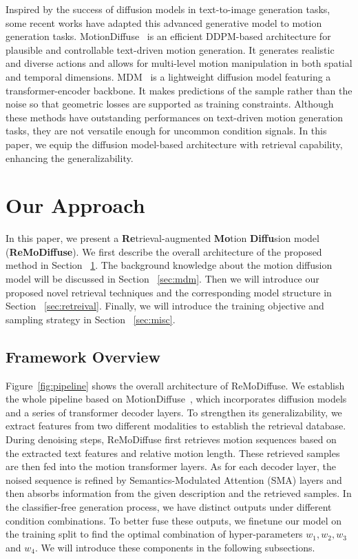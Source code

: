 \documentclass[10pt,twocolumn,letterpaper]{article}
\newcommand{\name}{ReMoDiffuse\xspace}
\begin{document}
Inspired by the success of diffusion models in text-to-image generation tasks, some recent works have adapted this advanced generative model to motion generation tasks. MotionDiffuse~\cite{zhang2022motiondiffuse} is an efficient DDPM-based architecture for plausible and controllable text-driven motion generation. It generates realistic and diverse actions and allows for multi-level motion manipulation in both spatial and temporal dimensions. MDM~\cite{tevet2022human} is a lightweight diffusion model featuring a transformer-encoder backbone. It makes predictions of the sample rather than the noise so that geometric losses are supported as training constraints. Although these methods have outstanding performances on text-driven motion generation tasks, they are not versatile enough for uncommon condition signals. In this paper, we equip the diffusion model-based architecture with retrieval capability, enhancing the generalizability.
 \section{Our Approach}
\label{sec:overview}

In this paper, we present a \textbf{Re}trieval-augmented \textbf{Mo}tion \textbf{Diffu}sion model (\textbf{\name}). We first describe the overall architecture of the proposed method in Section ~\ref{sec:overview}. The background knowledge about the motion diffusion model will be discussed in Section ~\ref{sec:mdm}. Then we will introduce our proposed novel retrieval techniques and the corresponding model structure in Section ~\ref{sec:retreival}. Finally, we will introduce the training objective and sampling strategy in Section ~\ref{sec:misc}.

\subsection{Framework Overview}


Figure~\ref{fig:pipeline} shows the overall architecture of \name. We establish the whole pipeline based on MotionDiffuse~\cite{zhang2022motiondiffuse}, which incorporates diffusion models and a series of transformer decoder layers. To strengthen its generalizability, we extract features from two different modalities to establish the retrieval database. During denoising steps, \name first retrieves motion sequences based on the extracted text features and relative motion length. These retrieved samples are then fed into the motion transformer layers. As for each decoder layer, the noised sequence is refined by Semantics-Modulated Attention (SMA) layers and then absorbs information from the given description and the retrieved samples. In the classifier-free generation process, we have distinct outputs under different condition combinations. To better fuse these outputs, we finetune our model on the training split to find the optimal combination of hyper-parameters $w_1, w_2, w_3$ and $w_4$. We will introduce these components in the following subsections. 
\end{document}
